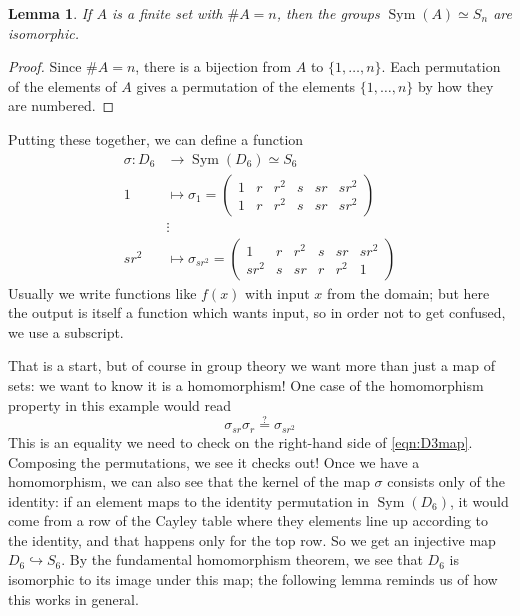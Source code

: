 \documentclass[12pt]{amsart}
\numberwithin{equation}{section}
\newtheorem{lem}[equation]{Lemma}
\theoremstyle{definition}
\theoremstyle{remark}
\numberwithin{equation}{section}
\DeclareMathOperator{\Sym}{Sym}
\begin{document}
\begin{lem} \label{lem:An}
If $A$ is a finite set with $\#A=n$, then the groups $\Sym(A) \simeq S_n$ are isomorphic.
\end{lem}

\begin{proof}
Since $\#A=n$, there is a bijection from $A$ to $\{1,\dots,n\}$.  Each permutation of the elements of $A$ gives a permutation of the elements $\{1,\dots,n\}$ by how they are numbered.  
\end{proof}

Putting these together, we can define a function
\begin{equation} \label{eqn:D3map}
\begin{aligned}
\sigma \colon D_6 &\to \Sym(D_6) \simeq S_6 \\
1 &\mapsto \sigma_1 = \begin{pmatrix}
1 & r & r^2 & s & sr & sr^2 \\
1 & r & r^2 & s & sr & sr^2
\end{pmatrix} \\
&\vdots \\
sr^2 &\mapsto \sigma_{sr^2} = \begin{pmatrix}
1 & r & r^2 & s & sr & sr^2 \\
sr^2 & s & sr & r & r^2 & 1
\end{pmatrix} 
\end{aligned}
\end{equation}
Usually we write functions like $f(x)$ with input $x$ from the domain; but here the output is itself a function which wants input, so in order not to get confused, we use a subscript.  

That is a start, but of course in group theory we want more than just a map of sets: we want to know it is a homomorphism!  One case of the homomorphism property in this example would read
\begin{equation} 
\sigma_{sr}\sigma_{r} \overset{?}{=} \sigma_{sr^2} 
\end{equation}
This is an equality we need to check on the right-hand side of \eqref{eqn:D3map}.  Composing the permutations, we see it checks out!  Once we have a homomorphism, we can also see that the kernel of the map $\sigma$ consists only of the identity: if an element maps to the identity permutation in $\Sym(D_6)$, it would come from a row of the Cayley table where they elements line up according to the identity, and that happens only for the top row.  So we get an injective map $D_6 \hookrightarrow S_6$.  By the fundamental homomorphism theorem, we see that $D_6$ is isomorphic to its image under this map; the following lemma reminds us of how this works in general.
\end{document}
